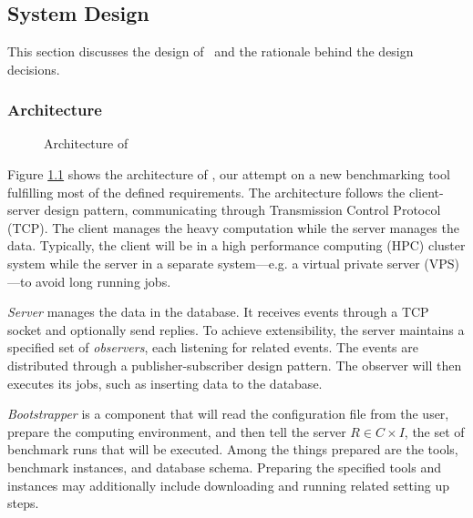 \chapter{\chImplementation}
\label{ch:implementation}

\section{System Design}

This section discusses the design of \OurBenchmarkingTool~and the rationale behind the design decisions.

\subsection{Architecture}
\label{sec:impl.architecture}

\begin{figure}
    \centering
    \caption{Architecture of \OurBenchmarkingTool}
    \label{fig:architecture}
\end{figure}

Figure \ref{fig:architecture} shows the architecture of \OurBenchmarkingTool, our attempt on a new benchmarking tool fulfilling most of the defined requirements.
The architecture follows the client-server design pattern, communicating through Transmission Control Protocol (TCP).
The client manages the heavy computation while the server manages the data.
Typically, the client will be in a high performance computing (HPC) cluster system while the server in a separate system---e.g. a virtual private server (VPS)---to avoid long running jobs.

\emph{Server} manages the data in the database.
It receives events through a TCP socket and optionally send replies.
To achieve extensibility, the server maintains a specified set of \emph{observers}, each listening for related events.
The events are distributed through a publisher-subscriber design pattern.
The observer will then executes its jobs, such as inserting data to the database.

\emph{Bootstrapper} is a component that will read the configuration file from the user, prepare the computing environment, and then tell the server $R \in C \times I$, the set of benchmark runs that will be executed.
Among the things prepared are the tools, benchmark instances, and database schema.
Preparing the specified tools and instances may additionally include downloading and running related setting up steps.

